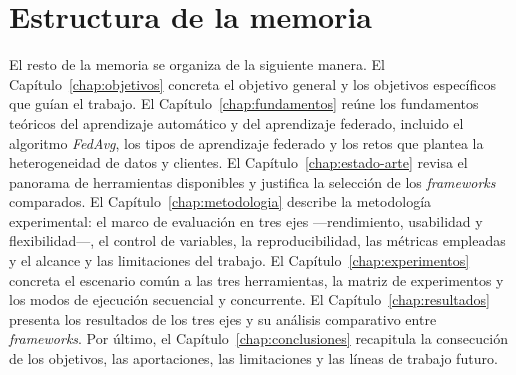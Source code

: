 \section{Estructura de la memoria}\label{sec:estructura}

El resto de la memoria se organiza de la siguiente manera. El
Capítulo~\ref{chap:objetivos} concreta el objetivo general y los objetivos específicos
que guían el trabajo. El Capítulo~\ref{chap:fundamentos} reúne los fundamentos teóricos
del aprendizaje automático y del aprendizaje federado, incluido el algoritmo
\textit{FedAvg}, los tipos de aprendizaje federado y los retos que plantea la
heterogeneidad de datos y clientes. El Capítulo~\ref{chap:estado-arte} revisa el panorama
de herramientas disponibles y justifica la selección de los \textit{frameworks}
comparados. El Capítulo~\ref{chap:metodologia} describe la metodología experimental: el
marco de evaluación en tres ejes —rendimiento, usabilidad y flexibilidad—, el control
de variables, la reproducibilidad, las métricas empleadas y el alcance y las
limitaciones del trabajo. El Capítulo~\ref{chap:experimentos} concreta
el escenario común a las tres herramientas, la matriz de experimentos y los modos de
ejecución secuencial y concurrente. El Capítulo~\ref{chap:resultados} presenta los
resultados de los tres ejes y su análisis comparativo entre \textit{frameworks}. Por
último, el Capítulo~\ref{chap:conclusiones} recapitula la consecución de los objetivos, las
aportaciones, las limitaciones y las líneas de trabajo futuro.
